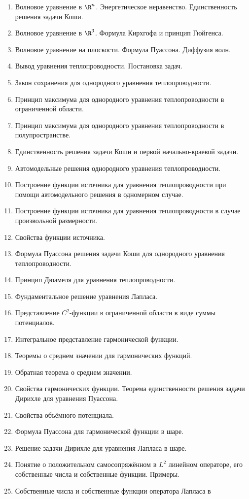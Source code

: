 \documentclass{trnotes}
\let \olditem = \item
\let \oldlabelenumi=\labelenumi%
\newcommand{\importantitem}{%
  \renewcommand{\labelenumi}{$\to$ \textbf{\oldlabelenumi}}%
  \olditem
}
\renewcommand{\item}{%
  \renewcommand{\labelenumi}{\oldlabelenumi}%
  \olditem
}
\begin{document}
\begin{enumerate}
\item  Волновое уравнение в $\R^n$.  Энергетическое неравенство. Единственность
  решения задачи Коши.
\item  Волновое уравнение в $\R^3$.  Формула Кирхгофа и принцип Гюйгенса.
\item  Волновое уравнение на плоскости. Формула Пуассона. Диффузия волн.
\importantitem  Вывод уравнения теплопроводности. Постановка задач.
\item  Закон сохранения для однородного уравнения теплопроводности.
\item  Принцип максимума для однородного уравнения теплопроводности в
  ограниченной области.
\item  Принцип максимума для однородного уравнения теплопроводности в
  полупространстве.
\item Единственность решения задачи Коши и первой
  начально-краевой задачи.
\item Автомодельные решения однородного уравнения теплопроводности.
\item  Построение функции источника для уравнения теплопроводности при помощи
  автомодельного решения в одномерном случае.
\item  Построение функции источника для уравнения теплопроводности в случае
  произвольной размерности.
\item  Свойства функции источника.
\item  Формула Пуассона решения задачи Коши для однородного уравнения
  теплопроводности.
\item  Принцип Дюамеля для уравнения теплопроводности.
\importantitem  Фундаментальное решение уравнения Лапласа.
\importantitem  Представление $C^2$-функции в ограниченной области в виде суммы
  потенциалов.
\importantitem  Интегральное представление гармонической функции.
\importantitem  Теоремы о среднем значении для гармонических функций.
\item  Обратная теорема о среднем значении.
\importantitem  Свойства гармонических функции. Теорема единственности решения задачи
  Дирихле для уравнения Пуассона.
\item  Свойства объёмного потенциала.
\item  Формула Пуассона для гармонической функции в шаре.
\item  Решение задачи Дирихле для уравнения Лапласа в шаре.
\importantitem  Понятие о положительном самосопряжённом в $L^2$ линейном операторе, его
  собственные числа и собственные функции. Примеры.
\item  Собственные числа и собственные функции оператора Лапласа в

\end{enumerate}
\end{document}
